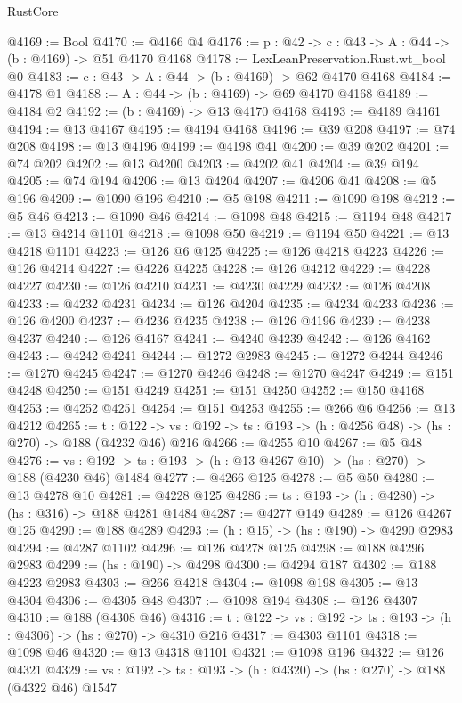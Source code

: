 \begin{lexlean}{RustCore}
\begin{coremodule}
@4169 := Bool
@4170 := @4166 @4
@4176 := {p : @42} -> {c : @43} -> {A : @44} -> (b : @4169) -> @51 @4170 @4168
@4178 := LexLeanPreservation.Rust.wt_bool @0
@4183 := {c : @43} -> {A : @44} -> (b : @4169) -> @62 @4170 @4168
@4184 := @4178 @1
@4188 := {A : @44} -> (b : @4169) -> @69 @4170 @4168
@4189 := @4184 @2
@4192 := (b : @4169) -> @13 @4170 @4168
@4193 := @4189 @4161
@4194 := @13 @4167
@4195 := @4194 @4168
@4196 := @39 @208
@4197 := @74 @208
@4198 := @13 @4196
@4199 := @4198 @41
@4200 := @39 @202
@4201 := @74 @202
@4202 := @13 @4200
@4203 := @4202 @41
@4204 := @39 @194
@4205 := @74 @194
@4206 := @13 @4204
@4207 := @4206 @41
@4208 := @5 @196
@4209 := @1090 @196
@4210 := @5 @198
@4211 := @1090 @198
@4212 := @5 @46
@4213 := @1090 @46
@4214 := @1098 @48
@4215 := @1194 @48
@4217 := @13 @4214 @1101
@4218 := @1098 @50
@4219 := @1194 @50
@4221 := @13 @4218 @1101
@4223 := @126 @6 @125
@4225 := @126 @4218 @4223
@4226 := @126 @4214
@4227 := @4226 @4225
@4228 := @126 @4212
@4229 := @4228 @4227
@4230 := @126 @4210
@4231 := @4230 @4229
@4232 := @126 @4208
@4233 := @4232 @4231
@4234 := @126 @4204
@4235 := @4234 @4233
@4236 := @126 @4200
@4237 := @4236 @4235
@4238 := @126 @4196
@4239 := @4238 @4237
@4240 := @126 @4167
@4241 := @4240 @4239
@4242 := @126 @4162
@4243 := @4242 @4241
@4244 := @1272 @2983
@4245 := @1272 @4244
@4246 := @1270 @4245
@4247 := @1270 @4246
@4248 := @1270 @4247
@4249 := @151 @4248
@4250 := @151 @4249
@4251 := @151 @4250
@4252 := @150 @4168
@4253 := @4252 @4251
@4254 := @151 @4253
@4255 := @266 @6
@4256 := @13 @4212
@4265 := {t : @122} ->
  {vs : @192} -> {ts : @193} -> (h : @4256 @48) -> (hs : @270) -> @188 (@4232 @46) @216
@4266 := @4255 @10
@4267 := @5 @48
@4276 := {vs : @192} -> {ts : @193} -> (h : @13 @4267 @10) -> (hs : @270) -> @188 (@4230 @46) @1484
@4277 := @4266 @125
@4278 := @5 @50
@4280 := @13 @4278 @10
@4281 := @4228 @125
@4286 := {ts : @193} -> (h : @4280) -> (hs : @316) -> @188 @4281 @1484
@4287 := @4277 @149
@4289 := @126 @4267 @125
@4290 := @188 @4289
@4293 := (h : @15) -> (hs : @190) -> @4290 @2983
@4294 := @4287 @1102
@4296 := @126 @4278 @125
@4298 := @188 @4296 @2983
@4299 := (hs : @190) -> @4298
@4300 := @4294 @187
@4302 := @188 @4223 @2983
@4303 := @266 @4218
@4304 := @1098 @198
@4305 := @13 @4304
@4306 := @4305 @48
@4307 := @1098 @194
@4308 := @126 @4307
@4310 := @188 (@4308 @46)
@4316 := {t : @122} -> {vs : @192} -> {ts : @193} -> (h : @4306) -> (hs : @270) -> @4310 @216
@4317 := @4303 @1101
@4318 := @1098 @46
@4320 := @13 @4318 @1101
@4321 := @1098 @196
@4322 := @126 @4321
@4329 := {vs : @192} -> {ts : @193} -> (h : @4320) -> (hs : @270) -> @188 (@4322 @46) @1547

\end{coremodule}
\end{lexlean}
